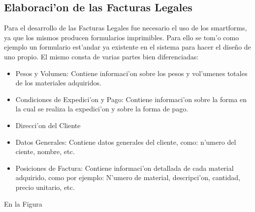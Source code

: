 \subsection{Elaboraci'on de las Facturas Legales}
	Para el desarrollo de las Facturas Legales fue necesario el uso de los smartforms, ya que los mismos producen formularios imprimibles. Para ello se tom'o como ejemplo un formulario est'andar ya existente en el sistema para hacer el dise\~no de uno propio. El mismo consta de varias partes bien diferenciadas:
\begin{itemize}
\item Pesos y Volumen: Contiene informaci'on sobre los pesos y vol'umenes totales de los materiales adquiridos.
\item Condiciones de Expedici'on y Pago: Contiene informaci'on sobre la forma en la cual se realiza la expedici'on y sobre la forma de pago.
\item Direcci'on del Cliente
\item Datos Generales: Contiene datos generales del cliente, como: n'umero del ciente, nombre, etc.
\item Posiciones de Factura: Contiene informaci'on detallada de cada material adquirido, como por ejemplo: N'umero de material, descripci'on, cantidad, precio unitario, etc.
\end{itemize}
	En la Figura  
